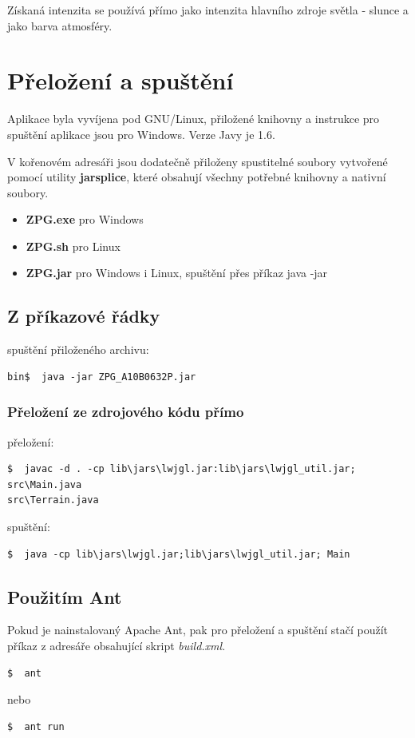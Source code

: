 \documentclass[11pt]{article}
\begin{document}
Získaná intenzita se používá přímo jako intenzita hlavního zdroje světla - slunce a jako barva atmosféry.

\clearpage
\section{Přeložení a spuštění}
Aplikace byla vyvíjena pod GNU/Linux, přiložené knihovny a instrukce pro
spuštění aplikace jsou pro Windows. Verze Javy je 1.6.

V kořenovém adresáři jsou dodatečně přiloženy spustitelné soubory vytvořené
pomocí utility \textbf{jarsplice}, které obsahují všechny potřebné knihovny a
nativní soubory.
\begin{itemize}
	\item \textbf{ZPG.exe} pro Windows
	\item \textbf{ZPG.sh} pro Linux
	\item \textbf{ZPG.jar} pro Windows i Linux, spuštění přes příkaz java -jar
\end{itemize}

\subsection{Z příkazové řádky}
spuštění přiloženého archivu:
\begin{verbatim}
bin$  java -jar ZPG_A10B0632P.jar
\end{verbatim}

\subsubsection{Přeložení ze zdrojového kódu přímo}
přeložení:
\begin{verbatim}
$  javac -d . -cp lib\jars\lwjgl.jar:lib\jars\lwjgl_util.jar; src\Main.java
src\Terrain.java
\end{verbatim}
spuštění:
\begin{verbatim}
$  java -cp lib\jars\lwjgl.jar;lib\jars\lwjgl_util.jar; Main
\end{verbatim}


\subsection{Použitím Ant}
Pokud je nainstalovaný Apache Ant, pak pro přeložení a spuštění stačí použít příkaz z adresáře obsahující skript \textit{build.xml}.
\begin{verbatim}
$  ant
\end{verbatim}
nebo 
\begin{verbatim}
$  ant run
\end{verbatim}
\end{document}
